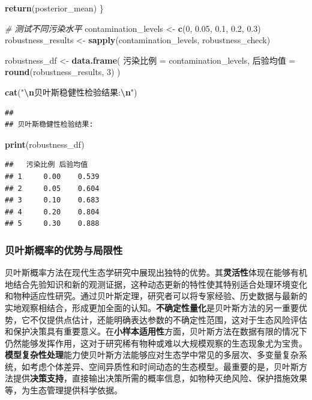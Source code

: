 \documentclass[
  twoside]{book}
\newenvironment{Shaded}{\begin{snugshade}}{\end{snugshade}}
\newcommand{\CommentTok}[1]{\textcolor[rgb]{0.56,0.35,0.01}{\textit{#1}}}
\newcommand{\DecValTok}[1]{\textcolor[rgb]{0.00,0.00,0.81}{#1}}
\newcommand{\FloatTok}[1]{\textcolor[rgb]{0.00,0.00,0.81}{#1}}
\newcommand{\FunctionTok}[1]{\textcolor[rgb]{0.13,0.29,0.53}{\textbf{#1}}}
\newcommand{\NormalTok}[1]{#1}
\newcommand{\OtherTok}[1]{\textcolor[rgb]{0.56,0.35,0.01}{#1}}
\newcommand{\SpecialCharTok}[1]{\textcolor[rgb]{0.81,0.36,0.00}{\textbf{#1}}}
\newcommand{\StringTok}[1]{\textcolor[rgb]{0.31,0.60,0.02}{#1}}
\begin{document}
\begin{Shaded}
\begin{Highlighting}[]
  \FunctionTok{return}\NormalTok{(posterior\_mean)}
\NormalTok{\}}

\CommentTok{\# 测试不同污染水平}
\NormalTok{contamination\_levels }\OtherTok{\textless{}{-}} \FunctionTok{c}\NormalTok{(}\DecValTok{0}\NormalTok{, }\FloatTok{0.05}\NormalTok{, }\FloatTok{0.1}\NormalTok{, }\FloatTok{0.2}\NormalTok{, }\FloatTok{0.3}\NormalTok{)}
\NormalTok{robustness\_results }\OtherTok{\textless{}{-}} \FunctionTok{sapply}\NormalTok{(contamination\_levels, robustness\_check)}

\NormalTok{robustness\_df }\OtherTok{\textless{}{-}} \FunctionTok{data.frame}\NormalTok{(}
\NormalTok{  污染比例 }\OtherTok{=}\NormalTok{ contamination\_levels,}
\NormalTok{  后验均值 }\OtherTok{=} \FunctionTok{round}\NormalTok{(robustness\_results, }\DecValTok{3}\NormalTok{)}
\NormalTok{)}

\FunctionTok{cat}\NormalTok{(}\StringTok{"}\SpecialCharTok{\textbackslash{}n}\StringTok{贝叶斯稳健性检验结果:}\SpecialCharTok{\textbackslash{}n}\StringTok{"}\NormalTok{)}
\end{Highlighting}
\end{Shaded}

\begin{verbatim}
## 
## 贝叶斯稳健性检验结果:
\end{verbatim}

\begin{Shaded}
\begin{Highlighting}[]
\FunctionTok{print}\NormalTok{(robustness\_df)}
\end{Highlighting}
\end{Shaded}

\begin{verbatim}
##   污染比例 后验均值
## 1     0.00    0.539
## 2     0.05    0.604
## 3     0.10    0.683
## 4     0.20    0.804
## 5     0.30    0.888
\end{verbatim}

\hypertarget{ux8d1dux53f6ux65afux6982ux7387ux7684ux4f18ux52bfux4e0eux5c40ux9650ux6027}{%
\subsubsection{贝叶斯概率的优势与局限性}\label{ux8d1dux53f6ux65afux6982ux7387ux7684ux4f18ux52bfux4e0eux5c40ux9650ux6027}}

贝叶斯概率方法在现代生态学研究中展现出独特的优势。其\textbf{灵活性}体现在能够有机地结合先验知识和新的观测证据，这种动态更新的特性使其特别适合处理环境变化和物种适应性研究。通过贝叶斯定理，研究者可以将专家经验、历史数据与最新的实地观察相结合，形成更加全面的认知。\textbf{不确定性量化}是贝叶斯方法的另一重要优势，它不仅提供点估计，还能明确表达参数的不确定性范围，这对于生态风险评估和保护决策具有重要意义。在\textbf{小样本适用性}方面，贝叶斯方法在数据有限的情况下仍然能够发挥作用，这对于研究稀有物种或难以大规模观察的生态现象尤为宝贵。\textbf{模型复杂性处理}能力使贝叶斯方法能够应对生态学中常见的多层次、多变量复杂系统，如考虑个体差异、空间异质性和时间动态的生态模型。最重要的是，贝叶斯方法提供\textbf{决策支持}，直接输出决策所需的概率信息，如物种灭绝风险、保护措施效果等，为生态管理提供科学依据。
\end{document}
